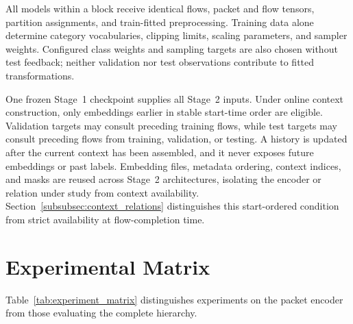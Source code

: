 \documentclass[11pt,fleqn]{report}
\begin{document}
All models within a block receive identical flows, packet and flow tensors, partition assignments, and train-fitted preprocessing. Training data alone determine category vocabularies, clipping limits, scaling parameters, and sampler weights. Configured class weights and sampling targets are also chosen without test feedback; neither validation nor test observations contribute to fitted transformations.

One frozen Stage~1 checkpoint supplies all Stage~2 inputs. Under online context construction, only embeddings earlier in stable start-time order are eligible. Validation targets may consult preceding training flows, while test targets may consult preceding flows from training, validation, or testing. A history is updated after the current context has been assembled, and it never exposes future embeddings or past labels. Embedding files, metadata ordering, context indices, and masks are reused across Stage~2 architectures, isolating the encoder or relation under study from context availability. Section~\ref{subsubsec:context_relations} distinguishes this start-ordered condition from strict availability at flow-completion time.

\section{Experimental Matrix}
\label{subsec:experimental_matrix}

Table~\ref{tab:experiment_matrix} distinguishes experiments on the packet encoder from those evaluating the complete hierarchy.
\end{document}
